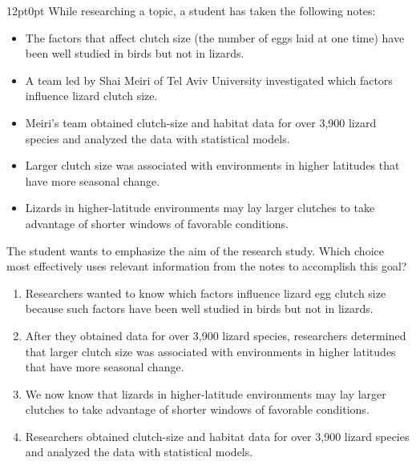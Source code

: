 \documentclass[11pt, twocolumn]{article}
\newcounter{questionnum}
\begin{document}
\vspace{6pt}\noindent
\begin{minipage}{\columnwidth}\raggedright
\noindent{}\par\vspace{8pt}
\begin{adjustwidth}{12pt}{0pt}
While researching a topic, a student has taken the following notes:

\begin{itemize}

\item The factors that affect clutch size (the number of eggs laid at one time) have been well studied in birds but not in lizards.

\item A team led by Shai Meiri of Tel Aviv University investigated which factors influence lizard clutch size.

\item Meiri's team obtained clutch-size and habitat data for over 3,900 lizard species and analyzed the data with statistical models.

\item Larger clutch size was associated with environments in higher latitudes that have more seasonal change.

\item Lizards in higher-latitude environments may lay larger clutches to take advantage of shorter windows of favorable conditions.

\end{itemize}
\vspace{6pt}

The student wants to emphasize the aim of the research study. Which choice most effectively uses relevant information from the notes to accomplish this goal?
\begin{enumerate}[label=\Alph*),leftmargin=18pt,topsep=3pt,itemsep=2pt]
  \item Researchers wanted to know which factors influence lizard egg clutch size because such factors have been well studied in birds but not in lizards.
  \item After they obtained data for over 3,900 lizard species, researchers determined that larger clutch size was associated with environments in higher latitudes that have more seasonal change.
  \item We now know that lizards in higher-latitude environments may lay larger clutches to take advantage of shorter windows of favorable conditions.
  \item Researchers obtained clutch-size and habitat data for over 3,900 lizard species and analyzed the data with statistical models.
\end{enumerate}
\end{adjustwidth}
\end{minipage}\par
\end{document}
